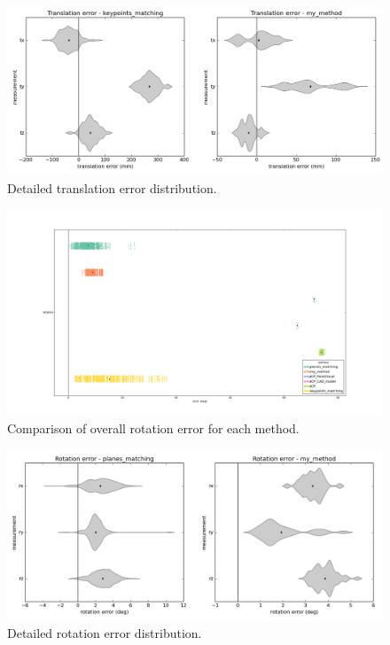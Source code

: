 \begin{figure}[h]
    \centering
    \includegraphics[width=\textwidth]{images/transl_violin.png}
    \caption{Detailed translation error distribution.}
    \label{fig:transl_violin}
\end{figure}

\begin{figure}[h]
    \centering
    \includegraphics[width=\textwidth]{images/rot_comp.png}
    \caption{Comparison of overall rotation error for each method.}
    \label{fig:rot_comp}
\end{figure}

\begin{figure}[h]
    \centering
    \includegraphics[width=\textwidth]{images/rot_violin.png}
    \caption{Detailed rotation error distribution.}
    \label{fig:rot_violin}
\end{figure}

